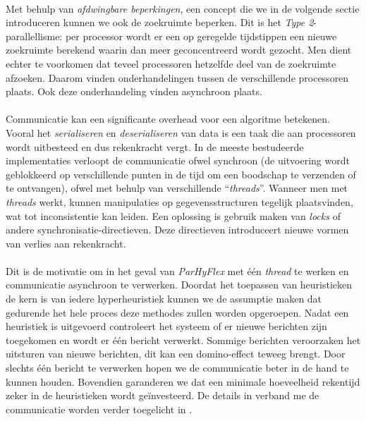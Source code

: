 \paragraph{}
Met behulp van \emph{afdwingbare beperkingen}, een concept die we in de volgende sectie introduceren kunnen we ook de zoekruimte beperken. Dit is het \emph{Type 2}-parallellisme: per processor wordt er een op geregelde tijdstippen een nieuwe zoekruimte berekend waarin dan meer geconcentreerd wordt gezocht. Men dient echter te voorkomen dat teveel processoren hetzelfde deel van de zoekruimte afzoeken. Daarom vinden onderhandelingen tussen de verschillende processoren plaats. Ook deze onderhandeling vinden asynchroon plaats.

\paragraph{}
Communicatie kan een significante overhead voor een algoritme betekenen. Vooral het \emph{serialiseren} en \emph{deserialiseren} van data is een taak die aan processoren wordt uitbesteed en dus rekenkracht vergt. In de meeste bestudeerde implementaties verloopt de communicatie ofwel synchroon (de uitvoering wordt geblokkeerd op verschillende punten in de tijd om een boodschap te verzenden of te ontvangen), ofwel met behulp van verschillende ``\emph{threads}''. Wanneer men met \emph{threads} werkt, kunnen manipulaties op gegevensstructuren tegelijk plaatsvinden, wat tot inconsistentie kan leiden. Een oplossing is gebruik maken van \emph{locks} of andere synchronisatie-directieven. Deze directieven introduceert nieuwe vormen van verlies aan rekenkracht.

\paragraph{}
Dit is de motivatie om in het geval van \emph{ParHyFlex} met \'e\'en \emph{thread} te werken en communicatie asynchroon te verwerken. Doordat het toepassen van heuristieken de kern is van iedere hyperheuristiek kunnen we de assumptie maken dat gedurende het hele proces deze methodes zullen worden opgeroepen. Nadat een heuristiek is uitgevoerd controleert het systeem of er nieuwe berichten zijn toegekomen en wordt er \'e\'en bericht verwerkt. Sommige berichten veroorzaken het uitsturen van nieuwe berichten, dit kan een domino-effect teweeg brengt. Door slechts \'e\'en bericht te verwerken hopen we de communicatie beter in de hand te kunnen houden. Bovendien garanderen we dat een minimale hoeveelheid rekentijd zeker in de heuristieken wordt ge\"investeerd. De details in verband me de communicatie worden verder toegelicht in .

